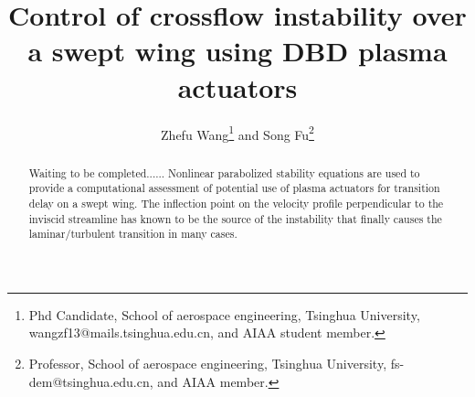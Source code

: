\documentclass{AIAA}
\begin{document}
\title{Control of crossflow instability over a swept wing using DBD plasma actuators}

\author{Zhefu Wang\footnote{Phd Candidate, School of aerospace engineering, Tsinghua University, wangzf13@mails.tsinghua.edu.cn, and AIAA student member.} and Song Fu\footnote{Professor, School of aerospace engineering, Tsinghua University, fs-dem@tsinghua.edu.cn, and AIAA member.}}

\begin{abstract}
{\color{red} Waiting to be completed......
Nonlinear parabolized stability equations are used to provide a computational assessment of potential use of plasma actuators for transition delay on a swept wing. The inflection point on the velocity profile perpendicular to the inviscid streamline has known to be the source of the instability that finally causes the laminar/turbulent transition in many cases.}
\end{abstract}
\end{document}

